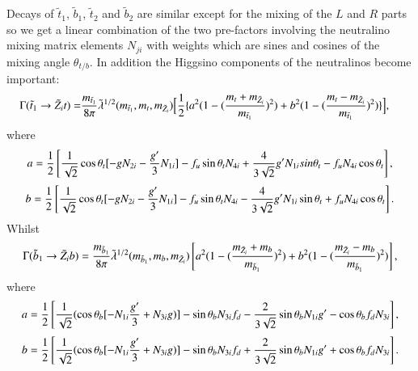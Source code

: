 \documentclass[final,3p,times]{elsarticle}
\begin{document}
Decays of $\tilde{t}_1$, $\tilde{b}_1$, $\tilde{t}_2$ and $\tilde{b}_2$ are
similar except for the mixing of the $L$ and $R$ parts so we get a linear
combination of the two pre-factors involving the neutralino mixing matrix
elements $N_{ji}$ with weights which are sines and cosines of the mixing angle
$\theta_{t/b}$. In addition the Higgsino components of the neutralinos become
important: 
\begin{equation}\label{t1tneut}
\begin{aligned}
\Gamma(\tilde{t}_1 \rightarrow \tilde{Z}_i t ) = & {m_{\tilde{t}_1} \over 8\pi}  \tilde{\lambda}^{1/2}(m_{\tilde{t}_1}, m_t, m_{\tilde{Z}_i}) \Big[\frac{1}{2}\{a^2(1-({m_t + m_{\tilde{Z}_i} \over m_{\tilde{t}_1}})^2) + b^2(1-({m_t - m_{\tilde{Z}_i} \over m_{\tilde{t}_1}})^2)\} \Big],
\end{aligned}
\end{equation} 
where
\begin{equation}
a = \frac{1}{2}\left[{1 \over \sqrt{2} }\cos\theta_{t}[-g N_{2i} - {g' \over 3} N_{1i}] - f_u \sin\theta_t N_{4i}  +  {4 \over 3\sqrt{2}} g' N_{1i} sin\theta_t - f_u N_{4i}\cos\theta_t\right],
\end{equation}
\begin{equation}
b = \frac{1}{2}\left[{1 \over \sqrt{2} }\cos\theta_{t}[-g N_{2i} - {g' \over 3} N_{1i}] - f_u \sin\theta_t N_{4i}  -  {4 \over 3\sqrt{2}} g' N_{1i}\sin\theta_t + f_u N_{4i}\cos\theta_t\right].
\end{equation}
Whilst
\begin{equation}\label{b1bneut}
\Gamma (\tilde{b}_1 \rightarrow \tilde{Z}_i b ) = {m_{\tilde{b}_1} \over 8\pi} \tilde{\lambda}^{1/2} (m_{\tilde{b}_1}, m_b, m_{\tilde{Z}_i}) \left[a^2 (1- ({m_{\tilde{Z}_i} + m_b \over m_{\tilde{b}_1}})^2) + b^2 (1- ({m_{\tilde{Z}_i} - m_b \over m_{\tilde{b}_1}})^2)\right],
\end{equation} 
where
\begin{equation}
\begin{aligned}
a = \frac{1}{2}\left[{1 \over \sqrt{2}}(\cos\theta_b[-N_{1i}{g' \over 3} + N_{3i}g)] - \sin\theta_b N_{3i}f_d - {2 \over 3\sqrt{2}}\sin{\theta_b}N_{1i}g' - \cos\theta_bf_d N_{3i}\right],
\end{aligned}
\end{equation}
\begin{equation}
\begin{aligned}
b = \frac{1}{2}\left[{1 \over \sqrt{2}}(\cos\theta_b[-N_{1i}{g' \over 3} + N_{3i}g)] - \sin\theta_b N_{3i}f_d + {2 \over 3\sqrt{2}}\sin{\theta_b}N_{1i}g' + \cos\theta_bf_d N_{3i}\right].
\end{aligned}
\end{equation}
\end{document}
